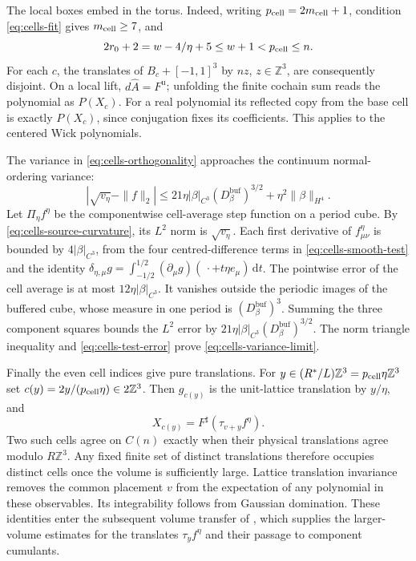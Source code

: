 \documentclass[11pt,letterpaper,reqno]{amsart}
\newcommand{\Z}{\mathbb Z}
\newcommand{\dd}{\mathrm d}
\begin{document}
The local boxes embed in the torus. Indeed, writing
$p_{\rm cell}=2m_{\rm cell}+1$, condition \eqref{eq:cells-fit} gives $m_{\rm cell}\ge7$,
and
\[
 2r_0+2=w-4/\eta+5\le w+1<p_{\rm cell}\le n.
\]
For each $c$, the translates of $B_c+[-1,1]^3$ by
$nz$, $z\in\Z^3$, are consequently disjoint.
On a local lift, $d\widehat A=F^{\mathrm u}$; unfolding
the finite cochain sum reads the polynomial as $P(X_c)$.
For a real polynomial its reflected copy from the base
cell is exactly $P(X_c)$, since conjugation fixes its
coefficients. This applies to the centered Wick polynomials.

The variance in \eqref{eq:cells-orthogonality} approaches
the continuum normal-ordering variance:
\begin{equation}\label{eq:cells-variance-limit}
 \left|\sqrt{v_\eta}-\|f\|_2\right|
 \le21\eta|\beta|_{C^3}(D_\beta^{\mathrm{buf}})^{3/2}
                      +\eta^2\|\beta\|_{H^4}.
\end{equation}
Let $\Pi_\eta f^\eta$ be the componentwise cell-average step
function on a period cube. By \eqref{eq:cells-source-curvature},
its $L^2$ norm is $\sqrt{v_\eta}$.
Each first derivative of $f^\eta_{\mu\nu}$ is bounded
by $4|\beta|_{C^3}$, from the four centred-difference
terms in \eqref{eq:cells-smooth-test} and the identity
$\delta_{\eta,\mu}g=\int_{-1/2}^{1/2}
(\partial_\mu g)(\,\cdot+t\eta e_\mu)\,\dd t$.
The pointwise error of the cell average is at most
$12\eta|\beta|_{C^3}$. It vanishes outside the periodic
images of the buffered cube, whose measure in one period
is $(D_\beta^{\mathrm{buf}})^3$.
Summing the three component squares bounds the $L^2$
error by $21\eta|\beta|_{C^3}(D_\beta^{\mathrm{buf}})^{3/2}$.
The norm triangle inequality and
\eqref{eq:cells-test-error} prove
\eqref{eq:cells-variance-limit}.

Finally the even cell indices give pure translations.
For $y\in(R^*/L)\Z^3=p_{\rm cell}\eta\Z^3$ set
$c(y)=2y/(p_{\rm cell}\eta)\in2\Z^3$. Then $g_{c(y)}$ is the unit-lattice
translation by $y/\eta$, and
\begin{equation}\label{eq:cells-translation-observable}
 X_{c(y)}=F^\sharp(\tau_{v+y}f^\eta).
\end{equation}
Two such cells agree on $C(n)$ exactly when their physical
translations agree modulo $R\Z^3$. Any fixed finite set
of distinct translations therefore occupies distinct
cells once the volume is sufficiently large.
Lattice translation invariance removes the common placement
$v$ from the expectation of any polynomial in these
observables. Its integrability follows from Gaussian
domination. These identities enter the subsequent volume transfer of
\cite[Theorem~A]{VolumeTransfer}, which supplies the larger-volume estimates
for the translates $\tau_yf^\eta$ and their passage to component cumulants.
\end{document}
